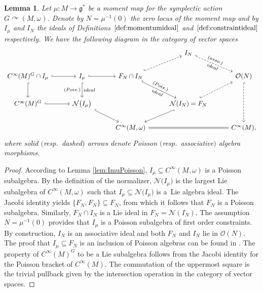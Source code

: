 \documentclass[pdftex]{sigma}
\numberwithin{equation}{section}
\newtheorem{Lemma}[Theorem]{Lemma}
\DeclareMathOperator{\action}{\curvearrowright}
\newcommand{\g}{\mathfrak{g}}
\renewcommand{\subset}{\subseteq}
\begin{document}
\begin{Lemma}\label{lem:ImuVSIN}
	Let $\mu\colon M\to\g^*$ be a moment map for the symplectic action $G\action (M,\omega)$. Denote by $N=\mu^{-1}(0)$ the zero locus of the moment map and by $I_\mu$ and $I_N$ the ideals of Definitions~$\ref{def:momentumideal}$ and~$\ref{def:constraintideal}$ respectively.
	We have the following diagram in the category of vector spaces
	\[
	\begin{tikzcd}[column sep = 2.8em]
		& & &
		I_N \ar[dr,hook,dashed,"(asso.)","ideal"',sloped]
		&
		\\
		C^\infty(M)^G\cap I_\mu \ar[r,hook] \ar[d,hook] &
		I_{\mu} \ar[r,hook] \ar[d,hook,"(Pois.)"',"ideal"]
		& F_N\cap I_N \ar[ur,sloped, hook, dashed] \ar[dr,sloped, hook,"(Pois.)","ideal"',sloped]
		& &
		\mathcal{O}(N) \ar[dd,hook,dashed]
		\\[.5em]
		C^\infty(M)^G \ar[r,hook] &
		\mathcal{N}\bigl(I_\mu\bigr) \ar[dr,hook,sloped]& &
		\mathcal{N}(I_N)=F_N \ar[ur,sloped,hook,dashed]\ar[dl,hook,sloped] &
		\\
		& &
		C^\infty(M,\omega) \ar[rr,equal]& &
		C^\infty(M),
	\end{tikzcd}	
	\]
	where solid $($resp.\ dashed$)$ arrows denote Poisson $($resp.\ associative$)$ algebra morphisms.
\end{Lemma}

\begin{proof}
	According to Lemma \ref{lem:ImuPoisson}, $I_\mu\subset C^\infty(M,\omega)$ is a Poisson subalgebra.
	By the definition of the normalizer, $\mathcal{N}\bigl(I_\mu\bigr)$ is the largest Lie subalgebra of $C^\infty(M,\omega)$ such that $I_\mu\subset\mathcal{N}\bigl(I_\mu\bigr)$ is a~Lie algebra ideal.
	The Jacobi identity yields $\{F_N,F_N\}\subset F_N$, from which it follows that $F_N$ is a Poisson subalgebra.
	Similarly, $F_N\cap I_N$ is a Lie ideal in $F_N= \mathcal{N}(I_N)$.
	The assumption $N=\mu^{-1}(0)$ provides that $I_\mu$ is a Poisson subalgebra of first order constraints.
	By construction, $I_{N}$ is an associative ideal and both $F_N$ and $I_N$ lie in $\mathcal{O}(N)$.
	The proof that $I_{\mu}\subset F_N$ is an inclusion of Poisson algebras can be found in \cite[Proposition~5.1]{ArmsGotayJennings90}.
	The property of $C^\infty(M)^G$ to be a Lie subalgebra follows from the Jacobi identity for the Poisson bracket of $C^\infty(M)$.
	The commutation of the uppermost square is the trivial pullback given by the intersection operation in the category of vector spaces.
\end{proof}
\end{document}
